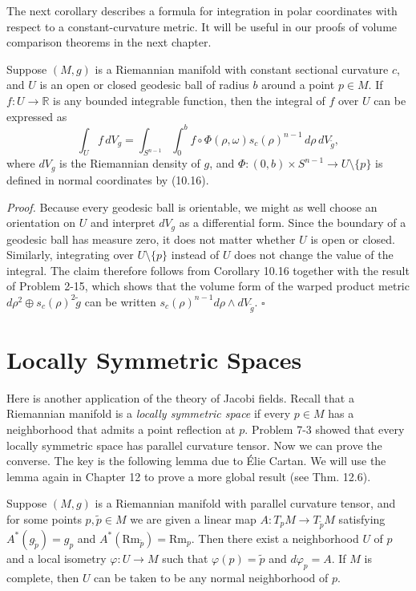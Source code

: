 The next corollary describes a formula for integration in polar coordinates with respect to a constant-curvature metric. It will be useful in our proofs of volume comparison theorems in the next chapter.

\begin{corollary}
\label{cor:polar-decomposition-integrals}
Suppose $(M,g)$ is a Riemannian manifold with constant sectional curvature $c$, and $U$ is an open or closed geodesic ball of radius $b$ around a point $p \in M$. If $f: U \to \mathbb{R}$ is any bounded integrable function, then the integral of $f$ over $U$ can be expressed as
\[
\int_U f \, dV_g = \int_{S^{n-1}} \int_0^b f \circ \Phi(\rho, \omega) s_c(\rho)^{n-1} \, d\rho \, dV_{\tilde{g}},
\]
where $dV_g$ is the Riemannian density of $g$, and $\Phi: (0,b) \times S^{n-1} \to U \setminus \{p\}$ is defined in normal coordinates by (10.16).

\textit{Proof.} Because every geodesic ball is orientable, we might as well choose an orientation on $U$ and interpret $dV_g$ as a differential form. Since the boundary of a geodesic ball has measure zero, it does not matter whether $U$ is open or closed. Similarly, integrating over $U \setminus \{p\}$ instead of $U$ does not change the value of the integral. The claim therefore follows from Corollary 10.16 together with the result of Problem 2-15, which shows that the volume form of the warped product metric $d\rho^2 \oplus s_c(\rho)^2 \tilde{g}$ can be written $s_c(\rho)^{n-1} d\rho \wedge dV_{\tilde{g}}$. \quad $\square$
\end{corollary}

\section{Locally Symmetric Spaces}

Here is another application of the theory of Jacobi fields. Recall that a Riemannian manifold is a \emph{locally symmetric space} if every $p \in M$ has a neighborhood that admits a point reflection at $p$. Problem 7-3 showed that every locally symmetric space has parallel curvature tensor. Now we can prove the converse. The key is the following lemma due to Élie Cartan. We will use the lemma again in Chapter 12 to prove a more global result (see Thm. 12.6).

\begin{lemma}
\label{lem:locally-symmetric-cartan}
Suppose $(M,g)$ is a Riemannian manifold with parallel curvature tensor, and for some points $p, \tilde{p} \in M$ we are given a linear map $A: T_p M \to T_{\tilde{p}} M$ satisfying $A^*(g_{\tilde{p}}) = g_p$ and $A^*(\text{Rm}_{\tilde{p}}) = \text{Rm}_p$. Then there exist a neighborhood $U$ of $p$ and a local isometry $\varphi: U \to M$ such that $\varphi(p) = \tilde{p}$ and $d\varphi_p = A$. If $M$ is complete, then $U$ can be taken to be any normal neighborhood of $p$.
\end{lemma}

